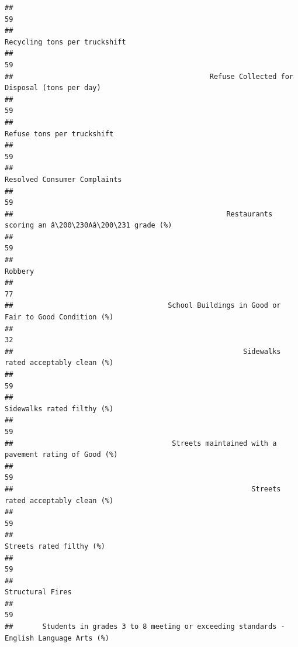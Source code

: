 \documentclass[]{article}
\begin{document}
\begin{verbatim}
##                                                                                         59 
##                                                              Recycling tons per truckshift 
##                                                                                         59 
##                                               Refuse Collected for Disposal (tons per day) 
##                                                                                         59 
##                                                                 Refuse tons per truckshift 
##                                                                                         59 
##                                                               Resolved Consumer Complaints 
##                                                                                         59 
##                                                   Restaurants scoring an â\200\230Aâ\200\231 grade (%) 
##                                                                                         59 
##                                                                                    Robbery 
##                                                                                         77 
##                                     School Buildings in Good or Fair to Good Condition (%) 
##                                                                                         32 
##                                                       Sidewalks rated acceptably clean (%) 
##                                                                                         59 
##                                                                 Sidewalks rated filthy (%) 
##                                                                                         59 
##                                      Streets maintained with a pavement rating of Good (%) 
##                                                                                         59 
##                                                         Streets rated acceptably clean (%) 
##                                                                                         59 
##                                                                   Streets rated filthy (%) 
##                                                                                         59 
##                                                                           Structural Fires 
##                                                                                         59 
##       Students in grades 3 to 8 meeting or exceeding standards - English Language Arts (%) 

\end{verbatim}
\end{document}
